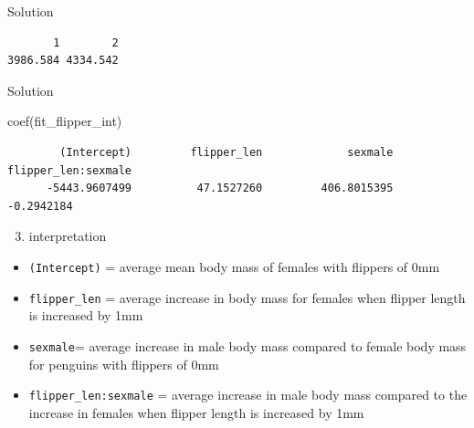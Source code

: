 \documentclass[
  10pt,
  ignorenonframetext,
  aspectratio=169,
  t]{beamer}
\newenvironment{Shaded}{\begin{snugshade}}{\end{snugshade}}
\newcommand{\FunctionTok}[1]{\textcolor[rgb]{0.28,0.35,0.67}{#1}}
\newcommand{\NormalTok}[1]{\textcolor[rgb]{0.00,0.23,0.31}{#1}}
\providecommand{\tightlist}{%
  \setlength{\itemsep}{0pt}\setlength{\parskip}{0pt}}
\newcommand{\bluenorm}[1]{\textcolor{bluebeamer}{#1}}
\let\oldtexttt\texttt
\renewcommand{\texttt}[1]{\colorbox{gray!20}{\oldtexttt{#1}}}
\begin{document}
\begin{frame}[fragile]{Solution}
\begin{verbatim}
       1        2 
3986.584 4334.542 
\end{verbatim}

\normalsize
\end{frame}

\begin{frame}[fragile]{Solution}
\protect{}\label{solution-5}
\footnotesize

\begin{Shaded}
\begin{Highlighting}[]
\FunctionTok{coef}\NormalTok{(fit\_flipper\_int)}
\end{Highlighting}
\end{Shaded}

\begin{verbatim}
        (Intercept)         flipper_len             sexmale flipper_len:sexmale 
      -5443.9607499          47.1527260         406.8015395          -0.2942184 
\end{verbatim}

\normalsize

\small

\begin{enumerate}
\setcounter{enumi}{2}
\tightlist
\item
  interpretation
\end{enumerate}

\begin{itemize}
\tightlist
\item
  \texttt{(Intercept)} = average mean body mass of females with flippers
  of 0mm
\item
  \texttt{flipper\_len} = average increase in body mass for females when
  flipper length is increased by 1mm
\item
  \texttt{sexmale}= average increase in male body mass
  \bluenorm{compared to female body mass} for penguins with flippers of
  0mm
\item
  \texttt{flipper\_len:sexmale} = average increase in male body mass
  \bluenorm{compared to the increase in females} when flipper length is
  increased by 1mm
\end{itemize}
\end{frame}
\end{document}
